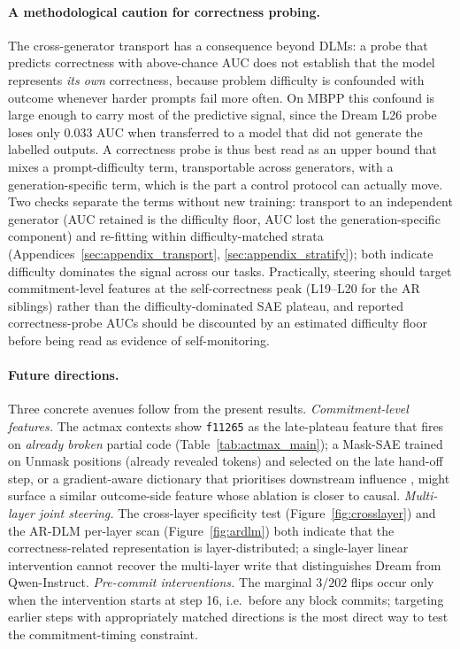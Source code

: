 \documentclass[11pt]{article}
\begin{document}
\paragraph{A methodological caution for correctness probing.}
\label{sec:caution}
The cross-generator transport has a consequence beyond DLMs: a probe that predicts correctness with above-chance AUC does not establish that the model represents \emph{its own} correctness, because problem difficulty is confounded with outcome whenever harder prompts fail more often.
On MBPP this confound is large enough to carry most of the predictive signal, since the Dream L26 probe loses only $0.033$ AUC when transferred to a model that did not generate the labelled outputs.
A correctness probe is thus best read as an upper bound that mixes a prompt-difficulty term, transportable across generators, with a generation-specific term, which is the part a control protocol can actually move.
Two checks separate the terms without new training: transport to an independent generator (AUC retained is the difficulty floor, AUC lost the generation-specific component) and re-fitting within difficulty-matched strata (Appendices~\ref{sec:appendix_transport}, \ref{sec:appendix_stratify}); both indicate difficulty dominates the signal across our tasks.
Practically, steering should target commitment-level features at the self-correctness peak (L19--L20 for the AR siblings) rather than the difficulty-dominated SAE plateau, and reported correctness-probe AUCs should be discounted by an estimated difficulty floor before being read as evidence of self-monitoring.

\paragraph{Future directions.}
\label{sec:future_work}
Three concrete avenues follow from the present results.
\emph{Commitment-level features.}
The actmax contexts show \texttt{f11265} as the late-plateau feature that fires on \emph{already broken} partial code (Table~\ref{tab:actmax_main}); a Mask-SAE trained on Unmask positions (already revealed tokens) and selected on the late hand-off step, or a gradient-aware dictionary that prioritises downstream influence \citep{olmo2025features}, might surface a similar outcome-side feature whose ablation is closer to causal.
\emph{Multi-layer joint steering.}
The cross-layer specificity test (Figure~\ref{fig:crosslayer}) and the AR-DLM per-layer scan (Figure~\ref{fig:ardlm}) both indicate that the correctness-related representation is layer-distributed; a single-layer linear intervention cannot recover the multi-layer write that distinguishes Dream from Qwen-Instruct.
\emph{Pre-commit interventions.}
The marginal $3/202$ flips occur only when the intervention starts at step 16, i.e.\ before any block commits; targeting earlier steps with appropriately matched directions is the most direct way to test the commitment-timing constraint.
\end{document}
